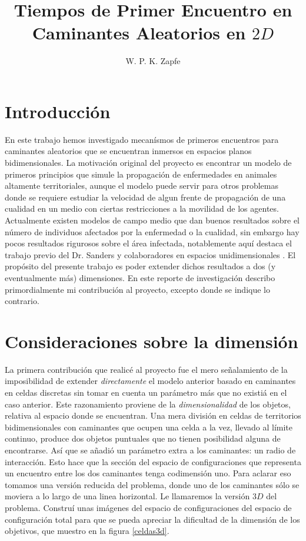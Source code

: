 \documentclass[letterpaperr,12pt]{article}
\title{Tiempos de Primer Encuentro en Caminantes Aleatorios en $2D$}
\author{W. P. K. Zapfe}
\begin{document}
\maketitle

\section{Introducción}

En este trabajo hemos investigado mecanísmos de primeros encuentros
para caminantes aleatorios que se encuentran inmersos en espacios
planos bidimensionales. La motivación original del proyecto es encontrar
un modelo de primeros principios que simule la propagación de enfermedades
en animales altamente territoriales, aunque el modelo puede servir
para otros problemas donde se requiere estudiar la velocidad
de algun frente de propagación de una cualidad en un medio con ciertas
restricciones a la movilidad de los agentes. Actualmente existen
modelos de campo medio que dan buenos resultados sobre el número
de individuos afectados por la enfermedad o la cualidad, sin embargo
hay pocos resultados rigurosos sobre el área infectada, notablemente
aquí destaca el trabajo previo del Dr. Sanders y colaboradores 
en espacios unidimensionales \cite{SandersLuca}.
El propósito del presente trabajo es poder extender dichos resultados
a dos (y eventualmente más) dimensiones. En este reporte de investigación
describo primordialmente mi contribución al proyecto, excepto
donde se indique lo contrario. 

\section{Consideraciones sobre la dimensión}

La primera contribución que realicé al proyecto fue el mero señalamiento
de la imposibilidad de extender \emph{directamente} el modelo anterior
basado en caminantes en celdas discretas sin tomar en cuenta
un parámetro más que no existiá en el caso anterior. Este
razonamiento proviene de la \emph{dimensionalidad} de los objetos, 
relativa al espacio donde se encuentran.
Una mera división en celdas de territorios bidimensionales con
caminantes que ocupen una celda a la vez, llevado al  límite continuo,
produce dos objetos puntuales que no tienen posibilidad alguna 
de encontrarse. Así 
que se añadió un parámetro extra a los caminantes: un radio de interacción.
Esto hace que la sección del espacio de configuraciones que
representa un encuentro entre los dos caminantes tenga codimensión
uno. Para aclarar eso tomamos una versión reducida del problema,
donde uno de los caminantes sólo se moviera a lo largo de una
linea horizontal. Le llamaremos la versión $3D$ del problema. Construí
unas imágenes del espacio de configuraciones del espacio de configuración
total para que se pueda apreciar la dificultad de la dimensión de los
objetivos, que muestro en la figura \ref{celdas3d}. 
\end{document}
